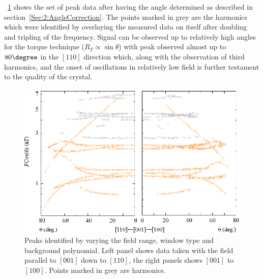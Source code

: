 \Fig~\ref{Fig:ResD:AngleSweepMeasured} shows the set of peak data after having the angle determined as described in section~\ref{Sec:2:AngleCorrection}. The points marked in grey are the harmonics which were identified by overlaying the measured data on itself after doubling and tripling of the frequency. Signal can be observed up to relatively high angles for the torque technique ($R_T \propto \sin{\theta}$) with peak observed almost up to $80\degree$  in the $[110]$ direction which, along with the observation of third harmonics, and the onset of oscillations in relatively low field is further testament to the quality of the crystal.
\begin{figure}[htbp]
    \begin{center}
        \includegraphics[scale=0.9]{Chapter-dHvABaFe2P2/Figures/AngleDepMeasurements/AngleSweepMeasured/AngleSweepMeasured}
        \caption{Peaks identified by varying the field range, window type and background polynomial. Left panel shows data taken with the field parallel to $[001]$ down to $[110]$, the right panels shows $[001]$ to $[100]$. Points marked in grey are harmonics.}
        \label{Fig:ResD:AngleSweepMeasured}
    \end{center}
\end{figure}


